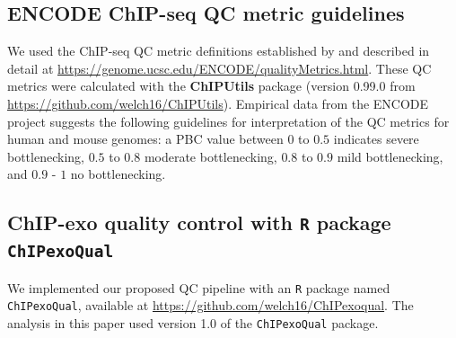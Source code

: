 \documentclass{bmcart}
\newcommand{\pname}[1]{\texttt{ChIPexoQual}}
\begin{document}
\subsection*{ENCODE  ChIP-seq QC metric guidelines}


We used the ChIP-seq QC metric definitions established by
\cite{encode_qc} and described in detail at
\url{https://genome.ucsc.edu/ENCODE/qualityMetrics.html}.  These QC
metrics were calculated with the \textbf{ChIPUtils} package (version
0.99.0 from \url{https://github.com/welch16/ChIPUtils}).
Empirical data from the ENCODE project suggests the following
guidelines for interpretation of the QC metrics for human and mouse
genomes: a PBC value between $0$ to $0.5$ indicates severe
bottlenecking, $0.5$ to $0.8$ moderate bottlenecking, $0.8$ to $0.9$
mild bottlenecking, and $0.9$ - $1$ no bottlenecking.

\subsection*{ChIP-exo quality control with \texttt{R} package
  \texttt{ChIPexoQual}}

We implemented our proposed QC pipeline with an \texttt{R} package
named \texttt{ChIPexoQual}, available at
\url{https://github.com/welch16/ChIPexoqual}. The analysis in this
paper used version 1.0 of the \pname{} package.
\end{document}
